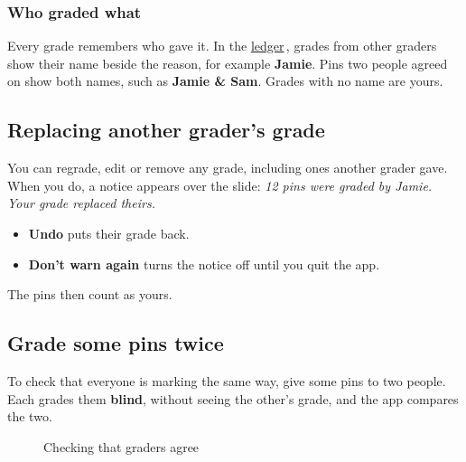 \subsubsection{Who graded what}\label{sec:handoff:who-graded-what}

Every grade remembers who gave it. In the \href{https://github.com/agadin/micro-speed-grader/blob/main/docs/help/ledger.md}{ledger}\,\onlinemark{}, grades from other graders show their name beside the reason, for example \textbf{Jamie}. Pins two people agreed on show both names, such as \textbf{Jamie \& Sam}. Grades with no name are yours.

\tocoff
\subsection{Replacing another grader's grade}\label{sec:handoff:replacing-another-graders-grade}
\tocon

You can regrade, edit or remove any grade, including ones another grader gave. When you do, a notice appears over the slide: \emph{12 pins were graded by Jamie. Your grade replaced theirs.}

\begin{itemize}[topsep=2pt, itemsep=2pt]
\item \textbf{Undo} puts their grade back.
\item \textbf{Don't warn again} turns the notice off until you quit the app.
\end{itemize}

The pins then count as yours.

\subsection{Grade some pins twice}\label{sec:handoff:grade-some-pins-twice}

To check that everyone is marking the same way, give some pins to two people. Each grades them \textbf{blind}, without seeing the other's grade, and the app compares the two.

\begin{figure}[H]\centering
{}\hspace{0.04\linewidth}%
\caption{Checking that graders agree}\label{fig:agree}
\end{figure}

